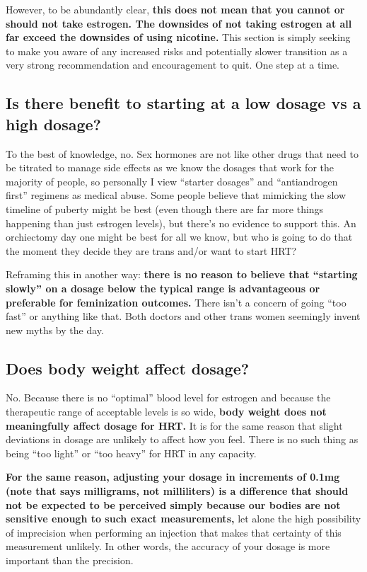 \documentclass{article}
\begin{document}
However, to be abundantly clear, \textbf{this does not mean that you cannot or should not take estrogen. The downsides of not taking estrogen at all far exceed the downsides of using nicotine.} This section is simply seeking to make you aware of any increased risks and potentially slower transition as a very strong recommendation and encouragement to quit. One step at a time.

\subsection{Is there benefit to starting at a low dosage vs a high dosage?}

To the best of knowledge, no. Sex hormones are not like other drugs that need to be titrated to manage side effects as we know the dosages that work for the majority of people, so personally I view “starter dosages” and “antiandrogen first” regimens as medical abuse. Some people believe that mimicking the slow timeline of puberty might be best (even though there are far more things happening than just estrogen levels), but there’s no evidence to support this. An orchiectomy day one might be best for all we know, but who is going to do that the moment they decide they are trans and/or want to start HRT?

Reframing this in another way: \textbf{there is no reason to believe that “starting slowly” on a dosage below the typical range is advantageous or preferable for feminization outcomes.} There isn't a concern of going “too fast” or anything like that. Both doctors and other trans women seemingly invent new myths by the day.

\subsection{Does body weight affect dosage?}

No. Because there is no “optimal” blood level for estrogen and because the therapeutic range of acceptable levels is so wide, \textbf{body weight does not meaningfully affect dosage for HRT.} It is for the same reason that slight deviations in dosage are unlikely to affect how you feel. There is no such thing as being “too light” or “too heavy” for HRT in any capacity.

\textbf{For the same reason, adjusting your dosage in increments of 0.1mg (note that says milligrams, not milliliters) is a difference that should not be expected to be perceived simply because our bodies are not sensitive enough to such exact measurements,} let alone the high possibility of imprecision when performing an injection that makes that certainty of this measurement unlikely. In other words, the accuracy of your dosage is more important than the precision.
\end{document}
